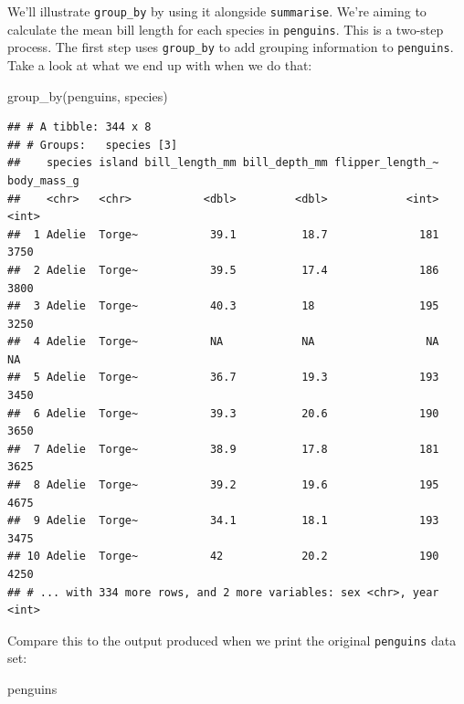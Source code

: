 \documentclass[
]{book}
\newenvironment{Shaded}{\begin{snugshade}}{\end{snugshade}}
\newcommand{\FunctionTok}[1]{\textcolor[rgb]{0.00,0.00,0.00}{#1}}
\newcommand{\NormalTok}[1]{#1}
\begin{document}
We'll illustrate \texttt{group\_by} by using it alongside \texttt{summarise}. We're aiming to calculate the mean bill length for each species in \texttt{penguins}. This is a two-step process. The first step uses \texttt{group\_by} to add grouping information to \texttt{penguins}. Take a look at what we end up with when we do that:

\begin{Shaded}
\begin{Highlighting}[]
\FunctionTok{group\_by}\NormalTok{(penguins, species)}
\end{Highlighting}
\end{Shaded}

\begin{verbatim}
## # A tibble: 344 x 8
## # Groups:   species [3]
##    species island bill_length_mm bill_depth_mm flipper_length_~ body_mass_g
##    <chr>   <chr>           <dbl>         <dbl>            <int>       <int>
##  1 Adelie  Torge~           39.1          18.7              181        3750
##  2 Adelie  Torge~           39.5          17.4              186        3800
##  3 Adelie  Torge~           40.3          18                195        3250
##  4 Adelie  Torge~           NA            NA                 NA          NA
##  5 Adelie  Torge~           36.7          19.3              193        3450
##  6 Adelie  Torge~           39.3          20.6              190        3650
##  7 Adelie  Torge~           38.9          17.8              181        3625
##  8 Adelie  Torge~           39.2          19.6              195        4675
##  9 Adelie  Torge~           34.1          18.1              193        3475
## 10 Adelie  Torge~           42            20.2              190        4250
## # ... with 334 more rows, and 2 more variables: sex <chr>, year <int>
\end{verbatim}

Compare this to the output produced when we print the original \texttt{penguins} data set:

\begin{Shaded}
\begin{Highlighting}[]
\NormalTok{penguins}
\end{Highlighting}
\end{Shaded}
\end{document}
